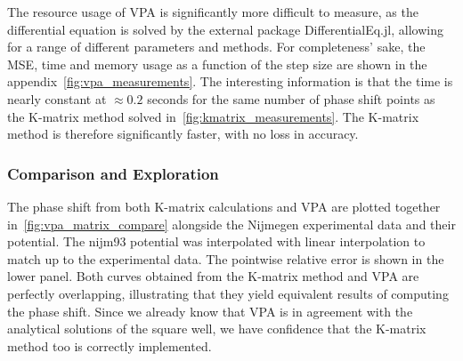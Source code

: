The resource usage of VPA is significantly more difficult to measure, as the
differential equation is solved by the external package
\textrm{DifferentialEq.jl}, allowing for a range of different parameters and
methods. For completeness' sake, the MSE, time and memory usage as a function of
the step size are shown in the appendix~\cref{fig:vpa_measurements}. The
interesting information is that the time is nearly constant at \(\approx 0.2\)
seconds for the same number of phase shift points as the K-matrix method solved
in~\cref{fig:kmatrix_measurements}. The K-matrix method is therefore
significantly faster, with no loss in accuracy.


\subsubsection{Comparison and Exploration}

The phase shift from both K-matrix calculations and VPA are plotted together
in~\cref{fig:vpa_matrix_compare} alongside the Nijmegen experimental data and
their potential. The nijm93 potential was interpolated with linear interpolation to match up to the
experimental data. The pointwise
relative error is shown in the lower panel. Both curves obtained from the
K-matrix method and VPA are perfectly overlapping, illustrating that they yield
equivalent results of computing the phase shift. Since we already know that VPA
is in agreement with the analytical solutions of the square well, we have
confidence that the K-matrix method too is correctly implemented.


